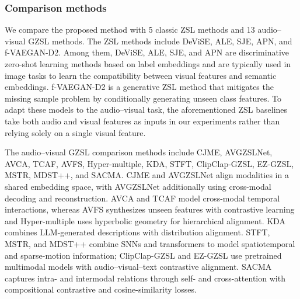 \documentclass[10pt,journal,twoside]{IEEEtran}
\begin{document}
\subsubsection{Comparison methods}
We compare the proposed method with 5 classic ZSL methods and 13 audio–visual GZSL methods. The ZSL methods include DeViSE\cite{38}, ALE\cite{39}, SJE\cite{40}, APN\cite{41}, and f-VAEGAN-D2\cite{42}. Among them, DeViSE, ALE, SJE, and APN are discriminative zero-shot learning methods based on label embeddings and are typically used in image tasks to learn the compatibility between visual features and semantic embeddings. f-VAEGAN-D2 is a generative ZSL method that mitigates the missing sample problem by conditionally generating unseen class features. To adapt these models to the audio–visual task, the aforementioned ZSL baselines take both audio and visual features as inputs in our experiments rather than relying solely on a single visual feature.


The audio–visual GZSL comparison methods include CJME\cite{3}, AVGZSLNet\cite{4}, AVCA\cite{1}, TCAF\cite{5}, AVFS\cite{6}, Hyper-multiple\cite{7}, KDA\cite{9}, STFT\cite{43}, ClipClap-GZSL\cite{2}, EZ-GZSL\cite{12}, MSTR\cite{14}, MDST++\cite{44}, and SACMA\cite{45}. CJME and AVGZSLNet align modalities in a shared embedding space, with AVGZSLNet additionally using cross-modal decoding and reconstruction. AVCA and TCAF model cross-modal temporal interactions, whereas AVFS synthesizes unseen features with contrastive learning and Hyper-multiple uses hyperbolic geometry for hierarchical alignment. KDA combines LLM-generated descriptions with distribution alignment. STFT, MSTR, and MDST++ combine SNNs and transformers to model spatiotemporal and sparse-motion information; ClipClap-GZSL and EZ-GZSL use pretrained multimodal models with audio–visual–text contrastive alignment. SACMA captures intra- and intermodal relations through self- and cross-attention with compositional contrastive and cosine-similarity losses.
\end{document}
